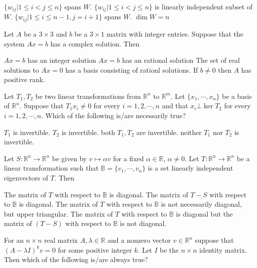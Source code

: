 \documentclass[10pt]{exam}
\begin{document}
\begin{questions}
\begin{checkboxes}
\choice $\{w_{ij}|1\leq i<j\leq n\}$ spans $W$.
\choice $\{w_{ij}|1\leq i<j\leq n\}$ is linearly independent subset of $W$.
\choice $\{w_{ij}|1\leq i\leq n-1,j=i+1\}$ spans $W$.
\choice $\dim W=n$
\end{checkboxes} 


\question 
Let $A $ be a $3 \times 3 $ and $b$ be a $3 \times 1 $ matrix with integer entries. Suppose that the system $Ax = b$ has a complex solution. Then 

\begin{checkboxes}
\choice $Ax = b $ has an integer solution 
\choice $Ax = b $ has an rational solution
\choice The set of real solutions to $Ax = 0 $ has a basis consisting of rationl solutions.
\choice If $ b \neq 0 $ then $A$ has positive rank.
\end{checkboxes}


\question
Let $T_1,T_2$ be two linear transformations from $\mathbb{R}^n$ to $\mathbb{R}^m$. Let $\{x_1,\cdots , x_n\}$ be a basis of
$\mathbb{R}^n$. Suppose that $T_1x_i \neq 0$ for every $i=1,2,\cdots, n$ and that $x_i \bot \ker T_2$ for every $i=1,2,\cdots, n$.
Which of the following is/are necessarily true?

\begin{checkboxes}
\choice $T_1$ is invertible.
\choice $T_2$ is invertible.
\choice both $T_1,T_2$ are invertible.
\choice neither $T_1$ nor $T_2$ is invertible.
\end{checkboxes}

\question
Let $S:\mathbb{R}^n \rightarrow \mathbb{R}^n$ be given by $v \longmapsto \alpha v$ for a fixed $\alpha \in \mathbb{R}$, $\alpha \neq
0$. Let $T:\mathbb{R}^n \rightarrow \mathbb{R}^n$ be a linear transformation such that $\mathbb{B}=\{v_1,\cdots , v_n\}$ is a set
linearly independent eigenvectors of $T$. Then

\begin{checkboxes}
\choice The matrix of $T$ with respect to $\mathbb{B}$ is diagonal.
\choice The matrix of $T-S$ with respect to $\mathbb{B}$ is diagonal.
\choice The matrix of $T$ with respect to $\mathbb{B}$ is not necessarily diagonal, but upper triangular.
\choice The matrix of $T$ with respect to $\mathbb{B}$ is diagonal but the matrix of $(T-S)$ with respect to $\mathbb{B}$ is not
diagonal.
\end{checkboxes}

\question
For an $n \times n$ real matrix $A,\lambda \in \mathbb{R}$ and a nonzero vector $v\in \mathbb{R}^n$ suppose that $(A-\lambda I)^kv=0$ for some
positive integer $k$. Let $I$ be the $n \times n$  identity matrix. Then which of the following is/are always true?


\end{questions}
\end{document}
